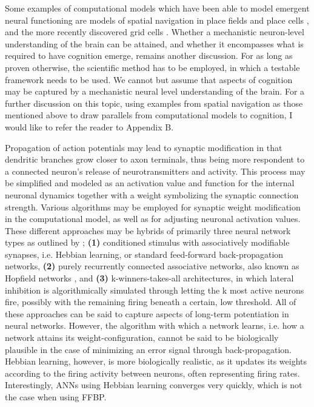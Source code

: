 Some examples of computational models which have been able to model emergent neural functioning are models of spatial navigation in place fields and place cells \citep{OKeefe1976, OKeefe1996}, and the more recently discovered grid cells \citep{Hafting2005}.
Whether a mechanistic neuron-level understanding of the brain can be attained, and whether it encompasses what is required to have cognition emerge, remains another discussion. For as long as proven otherwise, the scientific method has to be employed, in which a testable framework needs to be used. We cannot but assume that aspects of cognition may be captured by a mechanistic neural level understanding of the brain.
For a further discussion on this topic, using examples from spatial navigation as those mentioned above to draw parallels from computational models to cognition, I would like to refer the reader to Appendix B.

Propagation of action potentials may lead to synaptic modification in that dendritic branches grow closer to axon terminals, thus being more respondent to a connected neuron's release of neurotransmitters and activity. This process may be simplified and modeled as an activation value and function for the internal neuronal dynamics together with a weight symbolizing the synaptic connection strength. Various algorithms may be employed for synaptic weight modification in the computational model, as well as for adjusting neuronal activation values. These different approaches may be hybrids of primarily three neural network types as outlined by \cite{Rolls1998chpt1};
\textbf{(1)} conditioned stimulus with associatively modifiable synapses, i.e. Hebbian learning, or standard feed-forward back-propagation networks,
\textbf{(2)} purely recurrently connected associative networks, also known as Hopfield networks \citep{Hopfield1982}, and
\textbf{(3)} k-winners-takes-all architectures, in which lateral inhibition is algorithmically simulated through letting the k most active neurons fire, possibly with the remaining firing beneath a certain, low threshold. 
All of these approaches can be said to capture aspects of long-term potentiation in neural networks. However, the algorithm with which a network learns, i.e. how a network attains its weight-configuration, cannot be said to be biologically plausible in the case of minimizing an error signal through back-propagation. Hebbian learning, however, is more biologically realistic, as it updates its weights according to the firing activity between neurons, often representing firing rates. Interestingly, ANNs using Hebbian learning converges very quickly, which is not the case when using FFBP.


